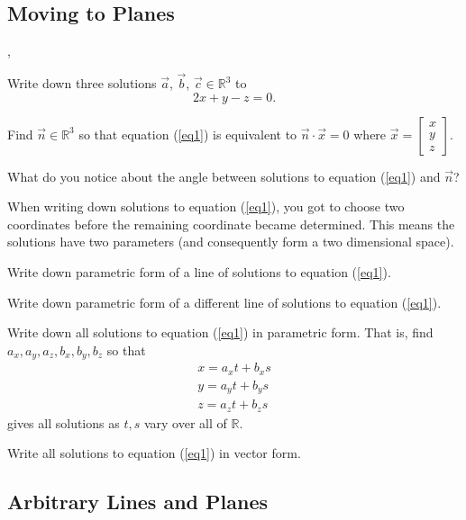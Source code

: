 \documentclass[letter]{article}
\newcommand{\R}{\mathbb{R}}
\begin{document}
\newpage

	\subsection*{Moving to Planes}
	
	\sep
	\vspace{-1cm}
	\begin{Enum}
		\item Write down three solutions $\vec a$, $\vec b$, $\vec c\in\R^3$ to
		\begin{equation}\label{eq1}
			2x+y-z=0.
		\end{equation}
		\item Find $\vec n\in\R^3$ so that equation (\ref{eq1}) is equivalent
		to $\vec n\cdot \vec x=0$ where $\vec x=\begin{bmatrix}x\\ y\\ z\end{bmatrix}$.
		\item What do you notice about the angle between solutions to equation (\ref{eq1}) and $\vec n$?
	\end{Enum}

	When writing down solutions to equation (\ref{eq1}), you got to choose two coordinates before the remaining
	coordinate became determined.  This means the solutions have two parameters (and consequently form a
	two dimensional space).

	\begin{Enum}[resume]
		\item Write down parametric form of a line of solutions to equation (\ref{eq1}).
		\item Write down parametric form of a different line of solutions to equation (\ref{eq1}).
		\item Write down all solutions to equation (\ref{eq1}) in parametric form.  That is, find $a_x,
		a_y,a_z,b_x,b_y,b_z$ so that
		\[
			\begin{array}{l}
				x=a_x t+b_x s\\
				y=a_y t+b_y s\\
				z=a_z t+b_z s
			\end{array}
		\]
		gives all solutions as $t,s$ vary over all of $\R$.
		\item Write all solutions to equation (\ref{eq1}) in vector form.
	\end{Enum}

\subsection*{Arbitrary Lines and Planes}
	
\end{document}
